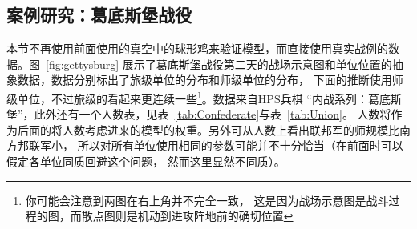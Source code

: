 \documentclass{article}
\begin{document}
\subsection{案例研究：葛底斯堡战役}


本节不再使用前面使用的真空中的球形鸡来验证模型，而直接使用真实战例的数据。图~\ref{fig:gettysburg}
展示了葛底斯堡战役第二天的战场示意图和单位位置的抽象数据，数据分别标出了旅级单位的分布和师级单位的分布，
下面的推断使用师级单位，不过旅级的看起来更连续一些\footnote{你可能会注意到两图在右上角并不完全一致，
这是因为战场示意图是战斗过程的图，而散点图则是机动到进攻阵地前的确切位置}。数据来自HPS兵棋
“内战系列：葛底斯堡”，此外还有一个人数表，见表~\ref{tab:Confederate}与表~\ref{tab:Union}。
人数将作为后面的将人数考虑进来的模型的权重。另外可从人数上看出联邦军的师规模比南方邦联军小，
所以对所有单位使用相同的参数可能并不十分恰当（在前面时可以假定各单位同质回避这个问题，
然而这里显然不同质）。
\end{document}
